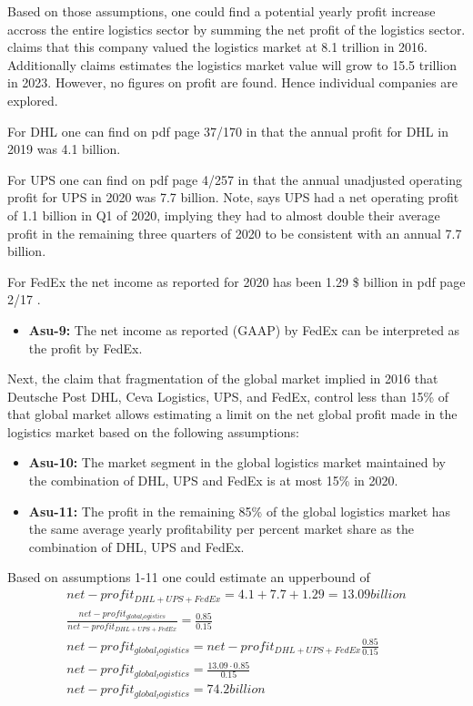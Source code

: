 Based on those assumptions, one could find a potential yearly profit increase accross the entire logistics sector by summing the net profit of the logistics sector. \cite{cips} claims that this company \cite{transparency_market_research} valued the logistics market at 8.1 trillion in 2016. Additionally \cite{cips} claims \cite{transparency_market_research} estimates the logistics market value will grow to 15.5 trillion in 2023. However, no figures on profit are found. Hence individual companies are explored. 

For DHL one can find on pdf page 37/170 in \cite{dhl_2019_annual_report} that the annual profit for DHL in 2019 was 4.1 billion.

For UPS one can find on pdf page 4/257 in \cite{ups_2020_annual_report} that the annual unadjusted operating profit for UPS in 2020 was 7.7 billion. Note, \cite{ups_q21_earnings_call} says UPS had a net operating profit of 1.1 billion in Q1 of 2020, implying they had to almost double their average profit in the remaining three quarters of 2020 to be consistent with an annual 7.7 billion.

For FedEx the net income as reported for 2020 has been 1.29 \$ billion in pdf page 2/17 \cite{fedex_2020_annual_report}. 

\begin{itemize}
\item \textbf{Asu-9:} The net income as reported (GAAP) by FedEx can be interpreted as the profit by FedEx.
\end{itemize}

Next, the claim that fragmentation of the global market implied in 2016 that Deutsche Post DHL, Ceva Logistics, UPS, and FedEx, control less than 15\% of that global market allows estimating a limit on the net global profit made in the logistics market based on the following assumptions:

\begin{itemize}
	\item \textbf{Asu-10:} The market segment in the global logistics market maintained by the combination of DHL, UPS and FedEx is at most 15\% in 2020.
	\item \textbf{Asu-11:} The profit in the remaining 85\% of the global logistics market has the same average yearly profitability per percent market share as the combination of DHL, UPS and FedEx.
\end{itemize}

Based on assumptions 1-11 one could estimate an upperbound of 
\begin{equation}
	\begin{split}
		net-profit_{DHL+UPS+FedEx}=4.1+7.7+1.29=13.09billion\\
		\frac{net-profit_{global_logistics}}{net-profit_{DHL+UPS+FedEx}}=\frac{0.85}{0.15}\\
		net-profit_{global_logistics}=net-profit_{DHL+UPS+FedEx}\frac{0.85}{0.15}\\
		net-profit_{global_logistics}=\frac{13.09\cdot0.85}{0.15}\\
		net-profit_{global_logistics}=74.2 billion
	\end{split}
\end{equation}

